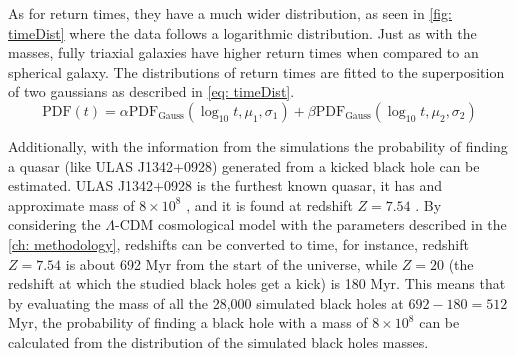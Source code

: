 	As for return times, they have a much wider distribution, as seen in \autoref{fig: timeDist} where the data follows a logarithmic distribution. Just as with the masses, fully triaxial galaxies have higher return times when compared to an spherical galaxy. The distributions of return times are fitted to the superposition of two gaussians as described in \autoref{eq: timeDist}.
	\begin{equation}\label{eq: timeDist}
		\text{PDF}(t) = \alpha \text{PDF}_\text{Gauss}(\log_{10}t, \mu_1, \sigma_1) + \beta \text{PDF}_\text{Gauss}(\log_{10}t, \mu_2, \sigma_2)
	\end{equation}
	
	Additionally, with the information from the simulations the probability of finding a quasar (like ULAS J1342+0928) generated from a kicked black hole can be estimated. ULAS J1342+0928 is the furthest known quasar, it has and approximate mass of $8\times10^8$ \sm, and it is found at redshift $Z = 7.54$ \cite{banados2018800, paris2018sloan}. By considering the $\Lambda$-CDM cosmological model with the parameters described in the \autoref{ch: methodology}, redshifts can be converted to time, for instance, redshift $Z = 7.54$ is about 692 Myr from the start of the universe, while $Z = 20$ (the redshift at which the studied black holes get a kick) is 180 Myr. This means that by evaluating the mass of all the 28,000 simulated black holes at $692 - 180 = 512$ Myr, the probability of finding a black hole with a mass of $8\times10^8$ \sm can be calculated from the distribution of the simulated black holes masses.
	
